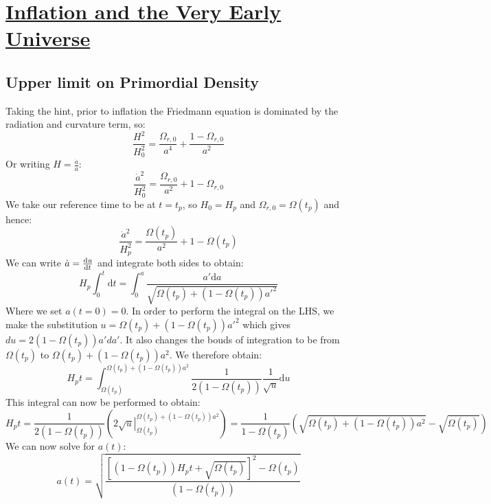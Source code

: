 \section[Inflation and the Very Early Universe]{\hyperlink{toc}{Inflation and the Very Early Universe}}

\subsection{Upper limit on Primordial Density}
Taking the hint, prior to inflation the Friedmann equation is dominated by the radiation and curvature term, so:
\begin{equation}
    \frac{H^2}{H_0^2} = \frac{\Omega_{r, 0}}{a^4} + \frac{1 - \Omega_{r, 0}}{a^2}
\end{equation}
Or writing $H = \frac{\dot{a}}{a}$:
\begin{equation}
    \frac{\dot{a}^2}{H_0^2} = \frac{\Omega_{r, 0}}{a^2} + 1 - \Omega_{r, 0}
\end{equation}
We take our reference time to be at $t = t_p$, so $H_0 = H_p$ and $\Omega_{r, 0} = \Omega(t_p)$ and hence:
\begin{equation}
    \frac{\dot{a}^2}{H_p^2} = \frac{\Omega(t_p)}{a^2} + 1 - \Omega(t_p)
\end{equation}
We can write $\dot{a} = \od{a}{t}$ and integrate both sides to obtain:
\begin{equation}
    H_p\int_{0}^{t} \mathrm d t = \int_{0}^{a}\frac{a'\mathrm d a}{\sqrt{\Omega(t_p) + (1 - \Omega(t_p))a'^2}}
\end{equation}
Where we set $a(t = 0) = 0$. In order to perform the integral on the LHS, we make the substitution $u = \Omega(t_p) + (1 - \Omega(t_p))a'^2$ which gives $du = 2(1 - \Omega(t_p))a' da'$. It also changes the bouds of integration to be from $\Omega(t_p)$ to $\Omega(t_p) + (1 - \Omega(t_p))a^2$. We therefore obtain:
\begin{equation}
    H_p t = \int_{\Omega(t_p)}^{\Omega(t_p) + (1 - \Omega(t_p))a^2} \frac{1}{2(1 - \Omega(t_p))}\frac{1}{\sqrt{u}}\mathrm d u
\end{equation}
This integral can now be performed to obtain:
\begin{equation}
    H_p t = \frac{1}{2(1 - \Omega(t_p))} \left(\left. 2\sqrt{u}\right|_{\Omega(t_p)}^{\Omega(t_p) + (1 - \Omega(t_p))a^2}\right) = \frac{1}{1 - \Omega(t_p)}\left(\sqrt{\Omega(t_p) + (1 - \Omega(t_p))a^2}- \sqrt{\Omega(t_p)}\right)
\end{equation}
We can now solve for $a(t)$:
\begin{equation}
    a(t) = \sqrt{\frac{\left[(1 - \Omega(t_p))H_p t +  \sqrt{\Omega(t_p)} \right]^2 - \Omega(t_p)}{(1 - \Omega(t_p))}}
\end{equation}
